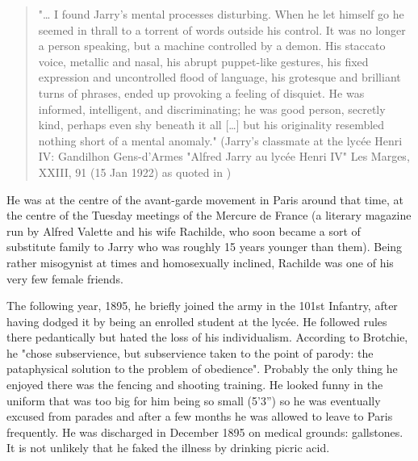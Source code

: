 \begin{quote}
  "… I found Jarry's mental processes disturbing. When he let himself go he seemed in thrall to a torrent of words outside his control. It was no longer a person speaking, but a machine controlled by a demon. His staccato voice, metallic and nasal, his abrupt puppet-like gestures, his fixed expression and uncontrolled flood of language, his grotesque and brilliant turns of phrases, ended up provoking a feeling of disquiet. He was informed, intelligent, and discriminating; he was good person, secretly kind, perhaps even shy beneath it all […] but his originality resembled nothing short of a mental anomaly." (Jarry's classmate at the lycée Henri IV: Gandilhon Gens-d'Armes "Alfred Jarry au lycée Henri IV" Les Marges, XXIII, 91 (15 Jan 1922) as quoted in \citep{Brotchie2011})
\end{quote}

He was at the centre of the avant-garde movement in Paris around that time, at the centre of the Tuesday meetings of the Mercure de France (a literary magazine run by Alfred Valette and his wife Rachilde, who soon became a sort of substitute family to Jarry who was roughly 15 years younger than them). Being rather misogynist at times and homosexually inclined, Rachilde was one of his very few female friends.

The following year, 1895, he briefly joined the army in the 101st Infantry, after having dodged it by being an enrolled student at the lycée. He followed rules there pedantically but hated the loss of his individualism. According to Brotchie, he "chose subservience, but subservience taken to the point of parody: the pataphysical solution to the problem of obedience"\citep{Brotchie2011}. Probably the only thing he enjoyed there was the fencing and shooting training. He looked funny in the uniform that was too big for him being so small (5'3'') so he was eventually excused from parades and after a few months he was allowed to leave to Paris frequently. He was discharged in December 1895 on medical grounds: gallstones. It is not unlikely that he faked the illness by drinking picric acid.


